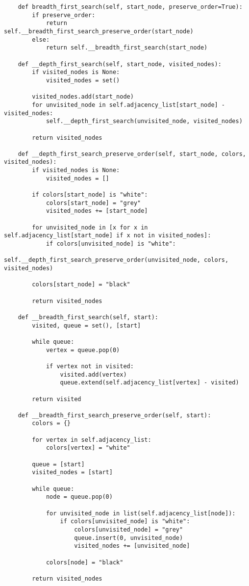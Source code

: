 \documentclass[12pt]{scrartcl}
\begin{document}
\begin{lstlisting}
    def breadth_first_search(self, start_node, preserve_order=True):
        if preserve_order:
            return self.__breadth_first_search_preserve_order(start_node)
        else:
            return self.__breadth_first_search(start_node)

    def __depth_first_search(self, start_node, visited_nodes):
        if visited_nodes is None:
            visited_nodes = set()

        visited_nodes.add(start_node)
        for unvisited_node in self.adjacency_list[start_node] - visited_nodes:
            self.__depth_first_search(unvisited_node, visited_nodes)

        return visited_nodes

    def __depth_first_search_preserve_order(self, start_node, colors, visited_nodes):
        if visited_nodes is None:
            visited_nodes = []

        if colors[start_node] is "white":
            colors[start_node] = "grey"
            visited_nodes += [start_node]

        for unvisited_node in [x for x in self.adjacency_list[start_node] if x not in visited_nodes]:
            if colors[unvisited_node] is "white":
                self.__depth_first_search_preserve_order(unvisited_node, colors, visited_nodes)

        colors[start_node] = "black"

        return visited_nodes

    def __breadth_first_search(self, start):
        visited, queue = set(), [start]

        while queue:
            vertex = queue.pop(0)

            if vertex not in visited:
                visited.add(vertex)
                queue.extend(self.adjacency_list[vertex] - visited)

        return visited

    def __breadth_first_search_preserve_order(self, start):
        colors = {}

        for vertex in self.adjacency_list:
            colors[vertex] = "white"

        queue = [start]
        visited_nodes = [start]

        while queue:
            node = queue.pop(0)

            for unvisited_node in list(self.adjacency_list[node]):
                if colors[unvisited_node] is "white":
                    colors[unvisited_node] = "grey"
                    queue.insert(0, unvisited_node)
                    visited_nodes += [unvisited_node]

            colors[node] = "black"

        return visited_nodes
\end{lstlisting}
\end{document}
